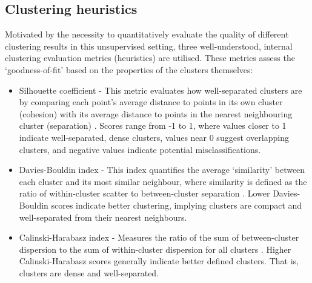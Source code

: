 \documentclass[10pt,oneside]{report}
\begin{document}
\subsection{Clustering heuristics} \label{sec:clusterheuristics}

Motivated by the necessity to quantitatively evaluate the quality of different clustering results in this unsupervised setting, three well-understood, internal clustering evaluation metrics (heuristics) are utilised. These metrics assess the `goodness-of-fit' based on the properties of the clusters themselves:
\begin{itemize}

    \item Silhouette coefficient - This metric evaluates how well-separated clusters are by comparing each point's average distance to points in its own cluster (cohesion) with its average distance to points in the nearest neighbouring cluster (separation) \cite{rousseeuw1987silhouettes}. Scores range from -1 to 1, where values closer to 1 indicate well-separated, dense clusters, values near 0 suggest overlapping clusters, and negative values indicate potential misclassifications.

    \item Davies-Bouldin index - This index quantifies the average `similarity' between each cluster and its most similar neighbour, where similarity is defined as the ratio of within-cluster scatter to between-cluster separation \cite{davies1979cluster}. Lower Davies-Bouldin scores indicate better clustering, implying clusters are compact and well-separated from their nearest neighbours.

    \item Calinski-Harabasz index - Measures the ratio of the sum of between-cluster dispersion to the sum of within-cluster dispersion for all clusters \cite{calinski1974dendrite}. Higher Calinski-Harabasz scores generally indicate better defined clusters. That is, clusters are dense and well-separated.
\end{itemize}
\end{document}

